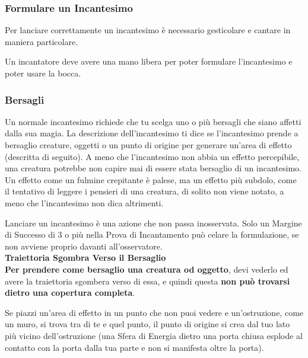 \documentclass[12pt,a4paper,twoside,openany]{book}
\begin{document}
\begin{multicols}{2}
\begin{itemize}
\end{itemize}

\subsubsection{Formulare un Incantesimo}

Per lanciare correttamente un incantesimo è necessario gesticolare e cantare in maniera particolare.

Un incantatore deve avere una mano libera per poter formulare l'incantesimo e poter usare la bocca.

\subsubsection{Bersagli}\label{magiebersagli}

Un normale incantesimo richiede che tu scelga uno o più bersagli che siano affetti dalla sua magia. La descrizione dell'incantesimo ti dice se l'incantesimo prende a bersaglio creature, oggetti o un punto di origine per generare un'area di effetto (descritta di seguito). A meno che l'incantesimo non abbia un effetto percepibile, una creatura potrebbe non capire mai di essere stata bersaglio di un incantesimo. Un effetto come un fulmine crepitante è palese, ma un effetto più subdolo, come il tentativo di leggere i pensieri di una creatura, di solito non viene notato, a meno che l'incantesimo non dica altrimenti.

Lanciare un incantesimo è una azione che non passa inosservata. Solo un Margine di Successo di 3 o più nella Prova di Incantamento può celare la formulazione, se non avviene proprio davanti all'osservatore.\\

\textbf{Traiettoria Sgombra Verso il Bersaglio}\\

\textbf{Per prendere come bersaglio una creatura od oggetto}, devi vederlo ed avere la traiettoria sgombera verso di essa, e quindi questa \textbf{non può trovarsi dietro una copertura completa}.

Se piazzi un'area di effetto in un punto che non puoi vedere e un'ostruzione, come un muro, si trova tra di te e quel punto, il punto di origine si crea dal tuo lato più vicino dell'ostruzione (una Sfera di Energia dietro una porta chiusa esplode al contatto con la porta dalla tua parte e non si manifesta oltre la porta).\\


\end{multicols}
\end{document}
